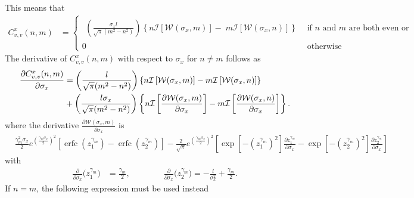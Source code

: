 \documentclass[a4paper,10pt]{article}
\DeclareMathOperator{\erfc}{erfc}
\begin{document}
This means that
\begin{align}\label{eq:Cyqys_nm}
 C^{x}_{v,v}(n,m)&=
\begin{cases}
\begin{aligned}
\left(\frac{\sigma_x
l}{\sqrt{\pi}(m^2-n^2)}\right)\left\{n\mathcal{I}\left[\mathcal{W}(\sigma_x, m) \right]-\;m\mathcal{I}\left[\mathcal{W}(\sigma_x, n)\right]\right\}
\end{aligned}  & \mbox{if }n\mbox{ and }m\mbox{ are both even or both odd}\\
0&\mbox{otherwise}
\end{cases}
\end{align}
The derivative of $C^x_{v,v}(n,m)$ with respect to $\sigma_x$ for
$n\ne m$ follows as
\begin{align}\label{eq:der:Cyqys_nm}
\frac{\partial C^x_{v,v}(n,m)}{\partial \sigma_x}&=
\left(\frac{l}{\sqrt{\pi}(m^2-n^2)}\right)\left\{n\mathcal{I}\left[\mathcal{W}(\sigma_x,
                                                   m)\right]
-m\mathcal{I}\left[\mathcal{W}(\sigma_x,n)\right]\right\}\notag\\
&+\left(\frac{l\sigma_x}{\sqrt{\pi}(m^2-n^2)}\right)
\left\{n\mathcal{I}\left[\frac{\partial\mathcal{W}(\sigma_x, m)}{\partial \sigma_x}\right]
-m\mathcal{I}\left[\frac{\partial\mathcal{W}(\sigma_x,n)}{\partial \sigma_x}\right]\right\}.
\end{align}
where the derivative $\frac{\partial {\mathcal{W}}(\sigma_x,m )}{\partial \sigma_x}$ is
\begin{align*}
&
   \frac{\gamma_m^2\sigma_x}{2} e^{\left(\frac{\gamma_m\sigma_x}{2}\right)^2}\left[\erfc\left(z_1^{\gamma_m}\right)-\erfc\left(z_2^{\gamma_m}\right)\right]
   -\frac{2}{\sqrt{\pi}}
   e^{\left(\frac{\gamma_m\sigma_x}{2}\right)^2}\left[
\exp\left[-\left(z_1^{\gamma_m}\right)^2\right]\frac{\partial z_1^{\gamma_m}}{\partial\sigma_x}- \exp\left[-\left(z_2^{\gamma_m}\right)^2\right]\frac{\partial z_2^{\gamma_m}}{\partial\sigma_x}\right]
\end{align*}
with
\begin{align*}
\frac{\partial}{\partial \sigma_x}\big(z_1^{\gamma_m}\big)&=\frac{\gamma_m}{2}, \qquad\qquad \frac{\partial}{\partial
\sigma_x}\big(z_2^{\gamma_m}\big)=-\frac{l}{\sigma_x^2}+\frac{\gamma_m}{2}.
\end{align*}
If $n=m$, the following expression must be used instead
\end{document}
